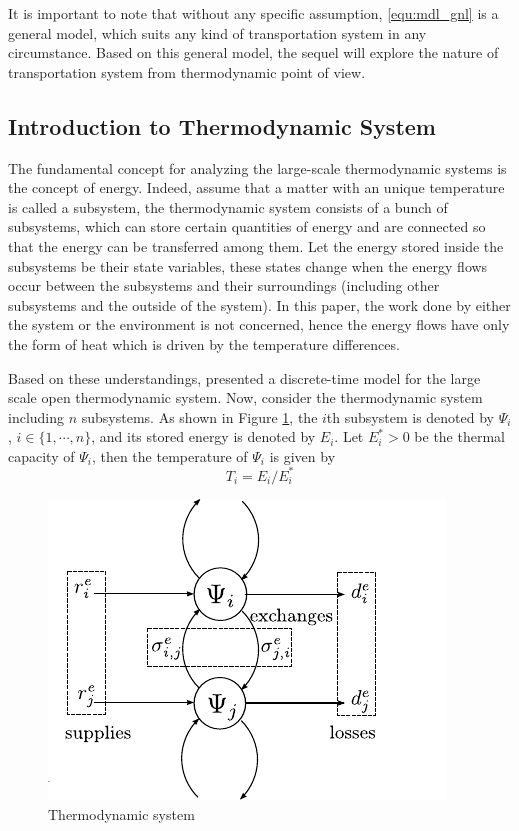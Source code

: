 \documentclass[preprint,authoryear,12pt]{elsarticle}
\begin{document}
It is important to note that without any specific assumption, \eqref{equ:mdl_gnl} is a general model, which suits any kind of transportation system in any circumstance. Based on this general model, the sequel will explore the nature of transportation system from thermodynamic point of view.

\subsection{Introduction to Thermodynamic System}

The fundamental concept for analyzing the large-scale thermodynamic systems is the concept of energy. Indeed, assume that a matter with an unique temperature is called a subsystem, the thermodynamic system consists of a bunch of subsystems, which can store certain quantities of energy and are connected so that the energy can be transferred among them. Let the energy stored inside the subsystems be their state variables, these states change when the energy flows occur between the subsystems and their surroundings (including other subsystems and the outside of the system). In this paper, the work done by either the system or the environment is not concerned, hence the energy flows have only the form of heat which is driven by the temperature differences.

Based on these understandings, \citet{haddad_thermodynamic_2005} presented a discrete-time model for the large scale open thermodynamic system. Now, consider the thermodynamic system including $n$ subsystems. As shown in Figure \ref{fig:Ther_Sys}, the $i$th subsystem is denoted by $\Psi_i$, $i\in \{1,\cdots,n\}$, and its stored energy is denoted by $E_i$. Let $E_i^*>0$ be the thermal capacity of $\Psi_i$, then the temperature of $\Psi_i$ is given by
\begin{equation}\label{equ:temperature}
    T_i= {E_i}/{E^*_i}
\end{equation}

\begin{figure}[ht]
  \centering
  \includegraphics{pics/HModel}
  \caption{Thermodynamic system}
  \label{fig:Ther_Sys}
\end{figure}
\end{document}
